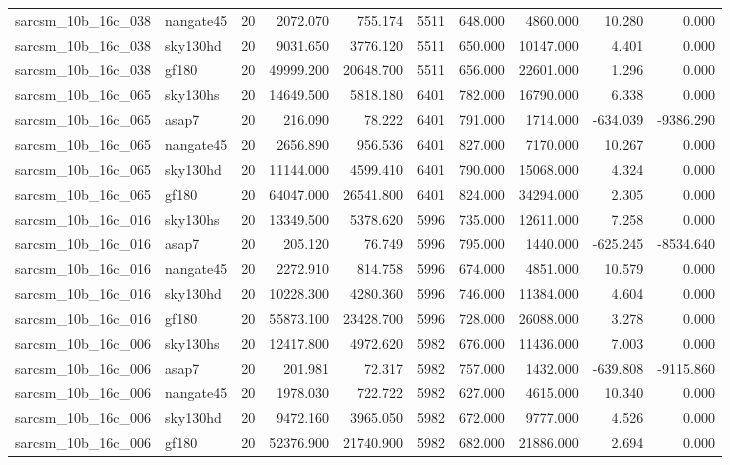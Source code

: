 \begin{longtable}{llrrrrrrrr}
sarcsm\_10b\_16c\_038 & nangate45 & 20 & 2072.070 & 755.174 & 5511 & 648.000 & 4860.000 & 10.280 & 0.000 \\
sarcsm\_10b\_16c\_038 & sky130hd & 20 & 9031.650 & 3776.120 & 5511 & 650.000 & 10147.000 & 4.401 & 0.000 \\
sarcsm\_10b\_16c\_038 & gf180 & 20 & 49999.200 & 20648.700 & 5511 & 656.000 & 22601.000 & 1.296 & 0.000 \\
sarcsm\_10b\_16c\_065 & sky130hs & 20 & 14649.500 & 5818.180 & 6401 & 782.000 & 16790.000 & 6.338 & 0.000 \\
sarcsm\_10b\_16c\_065 & asap7 & 20 & 216.090 & 78.222 & 6401 & 791.000 & 1714.000 & -634.039 & -9386.290 \\
sarcsm\_10b\_16c\_065 & nangate45 & 20 & 2656.890 & 956.536 & 6401 & 827.000 & 7170.000 & 10.267 & 0.000 \\
sarcsm\_10b\_16c\_065 & sky130hd & 20 & 11144.000 & 4599.410 & 6401 & 790.000 & 15068.000 & 4.324 & 0.000 \\
sarcsm\_10b\_16c\_065 & gf180 & 20 & 64047.000 & 26541.800 & 6401 & 824.000 & 34294.000 & 2.305 & 0.000 \\
sarcsm\_10b\_16c\_016 & sky130hs & 20 & 13349.500 & 5378.620 & 5996 & 735.000 & 12611.000 & 7.258 & 0.000 \\
sarcsm\_10b\_16c\_016 & asap7 & 20 & 205.120 & 76.749 & 5996 & 795.000 & 1440.000 & -625.245 & -8534.640 \\
sarcsm\_10b\_16c\_016 & nangate45 & 20 & 2272.910 & 814.758 & 5996 & 674.000 & 4851.000 & 10.579 & 0.000 \\
sarcsm\_10b\_16c\_016 & sky130hd & 20 & 10228.300 & 4280.360 & 5996 & 746.000 & 11384.000 & 4.604 & 0.000 \\
sarcsm\_10b\_16c\_016 & gf180 & 20 & 55873.100 & 23428.700 & 5996 & 728.000 & 26088.000 & 3.278 & 0.000 \\
sarcsm\_10b\_16c\_006 & sky130hs & 20 & 12417.800 & 4972.620 & 5982 & 676.000 & 11436.000 & 7.003 & 0.000 \\
sarcsm\_10b\_16c\_006 & asap7 & 20 & 201.981 & 72.317 & 5982 & 757.000 & 1432.000 & -639.808 & -9115.860 \\
sarcsm\_10b\_16c\_006 & nangate45 & 20 & 1978.030 & 722.722 & 5982 & 627.000 & 4615.000 & 10.340 & 0.000 \\
sarcsm\_10b\_16c\_006 & sky130hd & 20 & 9472.160 & 3965.050 & 5982 & 672.000 & 9777.000 & 4.526 & 0.000 \\
sarcsm\_10b\_16c\_006 & gf180 & 20 & 52376.900 & 21740.900 & 5982 & 682.000 & 21886.000 & 2.694 & 0.000 \\

\end{longtable}
